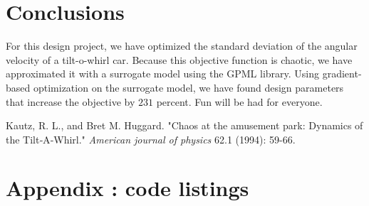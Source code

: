 \documentclass[11pt]{article}
\begin{document}
\section{Conclusions}

For this design project, we have optimized the standard
deviation of the angular velocity of a tilt-o-whirl car.
Because this objective function is chaotic, we have
approximated it with a surrogate model using the
\textsc{GPML} library. Using gradient-based optimization
on the surrogate model, we have found design parameters
that increase the objective by $231$ percent.
Fun will be had for everyone.

\begin{thebibliography}{1}
 Kautz, R. L., and Bret M. Huggard.
"Chaos at the amusement park: Dynamics of the Tilt‐A‐Whirl."
\emph{American journal of physics} 62.1 (1994): 59-66.
\end{thebibliography}

\newpage

\section{Appendix : code listings}


\newpage

\newpage

\newpage


\newpage

\end{document}
